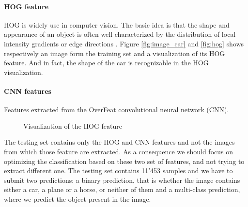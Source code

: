 \documentclass{article} %
\begin{document}
\paragraph{HOG feature} HOG is widely use in computer vision. 
The basic idea is that the shape and appearance of an object is often well characterized by the distribution of local intensity gradients or edge directions \cite{hog}.
Figure \ref{fig:image_car} and \ref{fig:hog} shows respectively an image form the training set and a visualization of its HOG feature.
And in fact, the shape of the car is recognizable in the HOG visualization.

\paragraph{CNN features} Features extracted from the OverFeat convolutional neural network (CNN).

\begin{figure}[!t]
	\centering
	\hspace{10pt}
	\caption{Visualization of the HOG feature}
\end{figure}

The testing set contains only the HOG and CNN features and not the images from which those feature are extracted.
As a consequence we should focus on optimizing the classification based on these two set of features, and not trying to extract different one.
The testing set contains 11'453 samples and we have to submit two predictions: a binary prediction, that is whether the image contains either a car, a plane or a horse, or neither of them and a multi-class 
prediction, where we predict the object present in the image.
\end{document}
